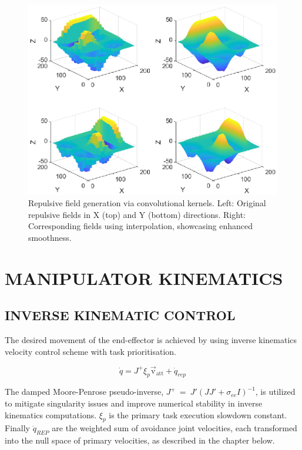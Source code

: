 \documentclass[letterpaper, 10 pt, conference]{ieeeconf}  %
\begin{document}
\begin{figure}
	\centering
	\includegraphics[width=1\linewidth]{non_and_interp_4_plots.eps} %
	\caption{Repulsive field generation via convolutional kernels. Left: Original repulsive fields in X (top) and Y (bottom) directions. Right: Corresponding fields using interpolation, showcasing enhanced smoothness.}
	\label{fig:interp-experiment}
\end{figure}

\section{MANIPULATOR KINEMATICS}

\subsection{INVERSE KINEMATIC CONTROL}

The desired movement of the end-effector is achieved by using inverse kinematics velocity control scheme with task prioritisation. 

\begin{equation}
	\dot{q} = J^+ \xi_{p} \mathrm{\vec{v}_{att}} + \dot{q}_{rep}
\end{equation}

The damped Moore-Penrose pseudo-inverse, \(J^+~=~J'(JJ' + \sigma_{ee} I)^{-1}\), is utilized to mitigate singularity issues and improve numerical stability in inverse kinematics computations. $\xi_{p}$ is the primary task execution slowdown constant. Finally $\dot{q}_{REP}$ are the weighted sum of avoidance joint velocities, each transformed into the null space of primary velocities, as described in the chapter below. 
\end{document}
